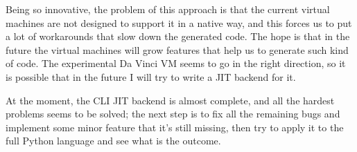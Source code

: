 {Being so innovative, the problem of this approach is that the current virtual machines are not designed to support it in a native way, and this forces us to put a lot of workarounds that slow down the generated code. The hope is that in the future the virtual machines will grow features that help us to generate such kind of code. The experimental Da Vinci VM seems to go in the right direction, so it is possible that in the future I will try to write a JIT backend for it.

At the moment, the CLI JIT backend is almost complete, and all the hardest problems seems to be solved; the next step is to fix all the remaining bugs and implement some minor feature that it's still missing, then try to apply it to the full Python language and see what is the outcome.
}
